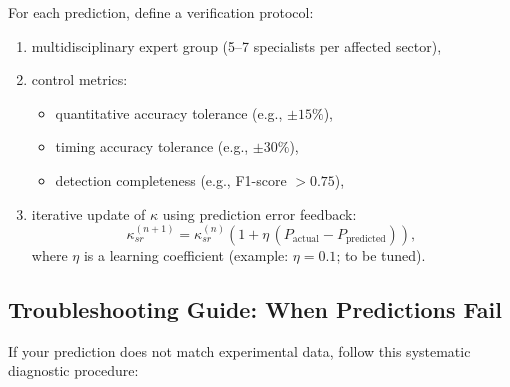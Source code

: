 \documentclass[13pt,a4paper]{article}
\begin{document}
	For each prediction, define a verification protocol:
	\begin{enumerate}[leftmargin=*]
		\item multidisciplinary expert group (5--7 specialists per affected sector),
		\item control metrics:
		\begin{itemize}[leftmargin=*]
			\item quantitative accuracy tolerance (e.g., $\pm 15\%$),
			\item timing accuracy tolerance (e.g., $\pm 30\%$),
			\item detection completeness (e.g., F1-score $>0.75$),
		\end{itemize}
		\item iterative update of $\kappa$ using prediction error feedback:
		\[
		\kappa_{sr}^{(n+1)}=\kappa_{sr}^{(n)}\left(1+\eta\,(P_{\mathrm{actual}}-P_{\mathrm{predicted}})\right),
		\]
		where $\eta$ is a learning coefficient (example: $\eta=0.1$; to be tuned).
	\end{enumerate}
	
	\subsection*{Troubleshooting Guide: When Predictions Fail}
	
	If your prediction does not match experimental data, follow this systematic diagnostic procedure:
	
\end{document}
